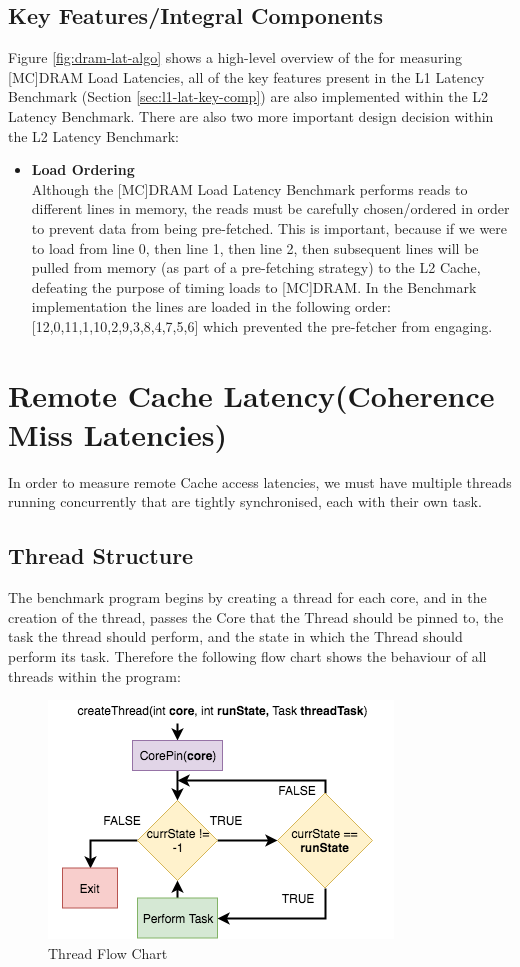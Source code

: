 \documentclass[bsc,frontabs,twoside,singlespacing,parskip,deptreport]{infthesis}     %
\begin{document}
\subsection{Key Features/Integral Components}\label{sec:mem-lat-key-comp}
Figure \ref{fig:dram-lat-algo} shows a high-level overview of the for measuring [MC]DRAM Load Latencies, all of the key features present in the L1 Latency Benchmark (Section \ref{sec:l1-lat-key-comp}) are also implemented within the L2 Latency Benchmark. There are also two more important design decision within the L2 Latency Benchmark:
\begin{itemize}
    \item{{\bf Load Ordering} \\
    Although the [MC]DRAM Load Latency Benchmark performs reads to different lines in memory, the reads must be carefully chosen/ordered in order to prevent data from being pre-fetched. This is important, because if we were to load from line 0, then line 1, then line 2, then subsequent lines will be pulled from memory (as part of a pre-fetching strategy) to the L2 Cache, defeating the purpose of timing loads to [MC]DRAM. In the Benchmark implementation the lines are loaded in the following order: [12,0,11,1,10,2,9,3,8,4,7,5,6] which prevented the pre-fetcher from engaging.}
\end{itemize}

\newpage

\section{Remote Cache Latency(Coherence Miss Latencies)}\label{coherence-latencies}
In order to measure remote Cache access latencies, we must have multiple threads running concurrently that are tightly synchronised, each with their own task.

\subsection{Thread Structure}
 The benchmark program begins by creating a thread for each core, and in the creation of the thread, passes the Core that the Thread should be pinned to, the task the thread should perform, and the state in which the Thread should perform its task. Therefore the following flow chart shows the behaviour of all threads within the program:

\begin{figure}[!h]
    \centering
    \includegraphics{Thread_Structure.png}
    \caption{Thread Flow Chart}
    \label{fig:thread-flowchart}
\end{figure}
\end{document}

